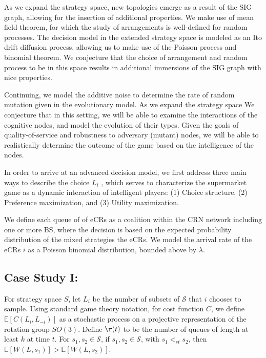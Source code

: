 \documentclass[10pt]{article}
\newcommand{\mcS}{\mathcal{S}}
\theoremstyle{definition}
\begin{document}
As we expand the strategy space, new topologies emerge as a result of the SIG graph, allowing for the insertion of additional properties. We make use of mean field theorem, for which the study of arrangements is well-defined for random processes.
The decision model in the extended strategy space is modeled as an Ito drift
diffusion process, allowing us to make use of the Poisson process and binomial
theorem. We conjecture that the choice of arrangement and random process to be in this space results in additional immersions of the SIG graph with nice properties.

Continuing, we model the additive noise to determine the rate of random mutation given in the evolutionary model. As we expand the strategy space
We conjecture that in this setting, we will be able to examine the interactions of the cognitive nodes, and model the evolution of their types. Given the goals of quality-of-service and robustness to adversary (mutant) nodes, we will be able to realistically determine the outcome of the game based on the intelligence of the nodes.

In order to arrive at an advanced decision model, we first
address three main ways to describe the choice $L_i$ , which serves to characterize the supermarket game
as a dynamic interaction of intelligent players: (1) Choice structure, (2) Preference maximization,
and (3) Utility maximization.

We define each queue of of eCRs as a coalition
within the CRN network including one or more BS, where the decision is based on the expected
probability distribution of the mixed strategies the eCRs. We model the arrival
rate of the eCRs $i$ as a Poisson binomial distribution, bounded above by $\lambda$.

\subsection{Case Study I:}
For strategy space $S$,
let $L_i$ be the number of subsets of $\mcS$ that $i$ chooses to sample.
Using standard game theory notation, for cost function $C$, we define
$\mathbb{E}[C(L_i, L_{-i})]$ as a stochastic process on a projective
representation of the rotation group $SO(3)$. 
Define $\r(t)$ to be the number of queues of length at least $k$ at time $t$.
For $s_1, s_2 \in \mcS$, if $s_1,s_2 \in \mcS$, with $s_1 <_{st} s_2$, then
$\mathbb{E}[W(L,s_1)] > \mathbb{E}[W(L,s_2)]$.
\end{document}
